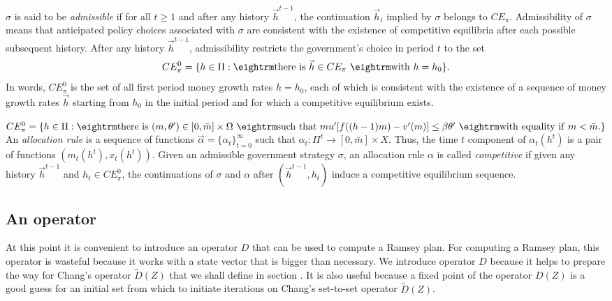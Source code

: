 \medskip
{} $\sigma$ is said to be {\it admissible\/} if for all $t \geq 1$ and  after any history $\vec h^{t-1}$, the continuation
$\vec h_t$ implied by $\sigma$ belongs to $CE_\pi$.
\medskip
Admissibility of $\sigma$ means that  anticipated policy choices associated with $\sigma$ are consistent with the existence
of competitive equilibria after each possible subsequent history.  After any history $\vec h^{t-1}$, admissibility restricts the government's choice in period $t$   to the set
$$ CE_\pi^0 = \{ h \in \Pi: {\rm there \ is } \ \vec h \in CE_\pi \ {\rm with } \ h=h_0 \} .$$
In words, $CE_\pi^0 $ is the set of all first period money growth rates $h=h_0$, each of which is   consistent with the existence of a sequence of money growth rates $\vec h$ starting from $h_0$ in the initial period
 and for which
a  competitive equilibrium exists.

\medskip
{} $CE_\pi^0 = \{h \in \Pi: {\rm there \ is } \ (m,\theta') \in [0, \bar m] \times \Omega \ {\rm such \ that } \
m u'[ f((h-1)m) - v'(m)]  \leq \beta \theta' \ {\rm with \ equality \ if } \  m < \bar m .\}$
\medskip
{} An {\it allocation rule\/} is a sequence of functions $\vec \alpha = \{\alpha_t\}_{t=0}^\infty$ such that
$\alpha_t: \Pi^t \rightarrow [0, \bar m] \times X$.
\medskip
\noindent Thus, the time $t$ component of $\alpha_t(h^t)$ is a pair of functions $(m_t(h^t), x_t(h^t))$.
\medskip
{} Given an admissible government strategy $\sigma$, an allocation rule $\alpha$ is called {\it competitive\/} if
given any history $\vec h^{t-1}$ and $h_t \in CE_\pi^0$, the continuations of $\sigma$ and $\alpha$ after
$(\vec h^{t-1},h_t)$ induce a  competitive equilibrium sequence.
\medskip



\subsection{An operator}\label{sec:firstDZ}%
At this point it is convenient to   introduce an operator $D$ that can be used to compute a Ramsey plan.  For computing a Ramsey plan,
this operator is wasteful because it works with a state vector that is bigger than necessary.  We introduce  operator $D$
because it helps to prepare the way for Chang's operator   $\tilde D(Z)$ that we shall define in section .
It is also useful because a fixed point of the operator $D(Z)$  is a good guess for an initial
set from which to initiate iterations on Chang's set-to-set operator $\tilde D(Z)$. %

